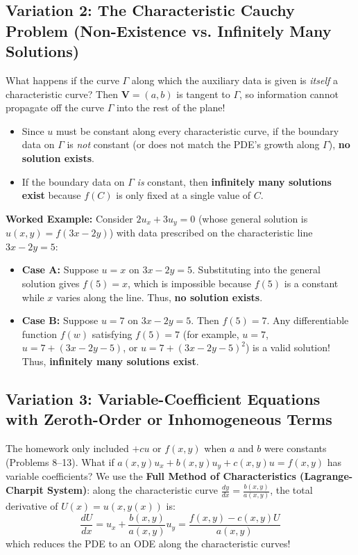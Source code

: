 \documentclass[11pt]{article}
\begin{document}
\subsection{Variation 2: The Characteristic Cauchy Problem (Non-Existence vs. Infinitely Many Solutions)}
What happens if the curve $\Gamma$ along which the auxiliary data is given is \emph{itself} a characteristic curve? Then $\mathbf{V} = (a, b)$ is tangent to $\Gamma$, so information cannot propagate off the curve $\Gamma$ into the rest of the plane!
\begin{itemize}
    \item Since $u$ must be constant along every characteristic curve, if the boundary data on $\Gamma$ is \emph{not} constant (or does not match the PDE's growth along $\Gamma$), \textbf{no solution exists}.
    \item If the boundary data on $\Gamma$ \emph{is} constant, then \textbf{infinitely many solutions exist} because $f(C)$ is only fixed at a single value of $C$.
\end{itemize}

\noindent\textbf{Worked Example:} Consider $2u_x + 3u_y = 0$ (whose general solution is $u(x, y) = f(3x - 2y)$) with data prescribed on the characteristic line $3x - 2y = 5$:
\begin{itemize}
    \item \textbf{Case A:} Suppose $u = x$ on $3x - 2y = 5$. Substituting into the general solution gives $f(5) = x$, which is impossible because $f(5)$ is a constant while $x$ varies along the line. Thus, \textbf{no solution exists}.
    \item \textbf{Case B:} Suppose $u = 7$ on $3x - 2y = 5$. Then $f(5) = 7$. Any differentiable function $f(w)$ satisfying $f(5) = 7$ (for example, $u = 7$, $u = 7 + (3x - 2y - 5)$, or $u = 7 + (3x - 2y - 5)^2$) is a valid solution! Thus, \textbf{infinitely many solutions exist}.
\end{itemize}

\subsection{Variation 3: Variable-Coefficient Equations with Zeroth-Order or Inhomogeneous Terms}
The homework only included $+cu$ or $f(x, y)$ when $a$ and $b$ were constants (Problems 8--13). What if $a(x, y)u_x + b(x, y)u_y + c(x, y)u = f(x, y)$ has variable coefficients? We use the \textbf{Full Method of Characteristics (Lagrange-Charpit System)}: along the characteristic curve $\frac{dy}{dx} = \frac{b(x,y)}{a(x,y)}$, the total derivative of $U(x) = u(x, y(x))$ is:
\[
\frac{dU}{dx} = u_x + \frac{b(x, y)}{a(x, y)}u_y = \frac{f(x, y) - c(x, y)U}{a(x, y)}
\]
which reduces the PDE to an ODE along the characteristic curves!
\end{document}
